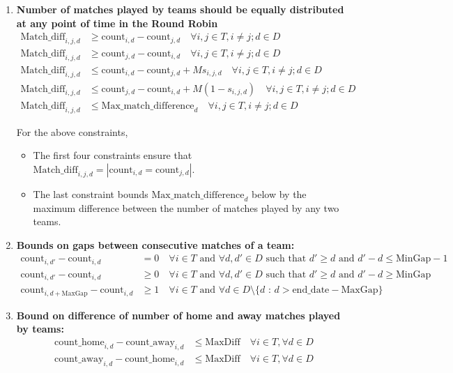 \documentclass[a4paper, 12pt]{article}
\begin{document}
\begin{enumerate}
    \item \textbf{Number of matches played by teams should be equally distributed at any point of time in the Round Robin}
    \begin{align*}
    \text{Match\_diff}_{i,j,d} &\geq \text{count}_{i,d} - \text{count}_{j,d} \quad \forall i,j \in T, i \neq j; d \in D\\
    \text{Match\_diff}_{i,j,d} &\geq \text{count}_{j,d} - \text{count}_{i,d}\quad \forall i,j \in T, i \neq j; d \in D\\
    \text{Match\_diff}_{i,j,d} &\leq \text{count}_{i,d} - \text{count}_{j,d} + M s_{i,j,d} \quad \forall i,j \in T, i \neq j; d \in D\\
    \text{Match\_diff}_{i,j,d} &\leq \text{count}_{j,d} - \text{count}_{i,d} + M (1 - s_{i,j,d}) \quad \forall i,j \in T, i \neq j; d \in D\\
    \text{Match\_diff}_{i,j,d} &\leq \text{Max\_match\_difference}_{d} \quad \forall i,j \in T, i \neq j; d \in D
    \end{align*}

    For the above constraints,
    \begin{itemize}
        \item The first four constraints ensure that $\text{Match\_diff}_{i,j,d} = |\text{count}_{i,d} = \text{count}_{j,d}|$.
        \item The last constraint bounds $\text{Max\_match\_difference}_{d}$ below by the maximum difference between the number of matches played by any two teams.
    \end{itemize}

    \item \textbf{Bounds on gaps between consecutive matches of a team:}
    \begin{align*}
        \text{count}_{i,d'} - \text{count}_{i,d} &= 0 \quad \forall i \in T \text{ and } \forall d, d' \in D \text{ such that $d' \geq d$ and $d' - d \leq \text{MinGap}$} - 1 \\
        \text{count}_{i,d'} - \text{count}_{i,d} &\geq 0 \quad \forall i \in T \text{ and } \forall d, d' \in D \text{ such that $d' \geq d$ and $d' - d \geq \text{MinGap}$} \\
        \text{count}_{i,d+\text{MaxGap}} - \text{count}_{i,d} &\geq 1 \quad \forall i \in T \text{ and } \forall d \in D \setminus \{d \text{ : } d > \text{end\_date} - \text{MaxGap} \} 
    \end{align*}

    \item \textbf{Bound on difference of number of home and away matches played by teams:}
    \begin{align*}
        \text{count\_home}_{i,d} - \text{count\_away}_{i,d} &\leq \text{MaxDiff} \quad \forall i \in T , \forall d \in D \\
        \text{count\_away}_{i,d} - \text{count\_home}_{i,d} &\leq \text{MaxDiff} \quad \forall i \in T , \forall d \in D
    \end{align*}


\end{enumerate}
\end{document}
